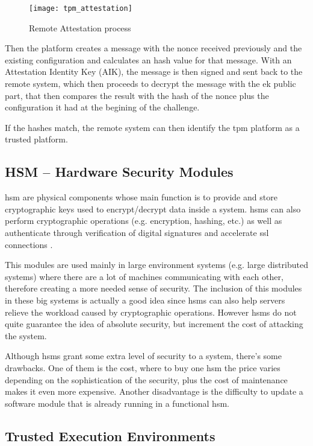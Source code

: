 \begin{figure}[htbp]
	\centering
	{\texttt{[image: tpm\_attestation]}}%
	\caption{Remote Attestation process}
	\label{fig:tpm_attestation}
\end{figure}

Then the platform creates a message with the nonce received previously and the existing configuration and calculates an hash value for that message. With an Attestation Identity Key (AIK), the message is then signed and sent back to the remote system, which then proceeds to decrypt the message with the \gls{ek} public part, that then compares the result with the hash of the nonce plus the configuration it had at the begining of the challenge. 

If the hashes match, the remote system can then identify the \gls{tpm} platform as a trusted platform.

\subsection{HSM – Hardware Security Modules}
\label{ssec:hsm}

\gls{hsm} \cite{hsmPaper} are physical components whose main function is to provide and store cryptographic keys used to encrypt/decrypt data inside a system. \gls{hsm}s can also perform cryptographic operations (e.g. encryption, hashing, etc.) as well as authenticate through verification of digital signatures and accelerate \gls{ssl} connections \cite{hsmThesis}.

This modules are used mainly in large environment systems (e.g. large distributed systems) where there are a lot of machines communicating with each other, therefore creating a more needed sense of security. The inclusion of this modules in these big systems is actually a good idea since \gls{hsm}s can also help servers relieve the workload caused by cryptographic operations. However \gls{hsm}s do not quite guarantee the idea of absolute security, but increment the cost of attacking the system.

Although \gls{hsm}s grant some extra level of security to a system, there's some drawbacks. One of them is the cost, where to buy one \gls{hsm} the price varies depending on the sophistication of the security, plus the cost of maintenance makes it even more expensive. Another disadvantage is the difficulty to update a software module that is already running in a functional \gls{hsm}.

\subsection{Trusted Execution Environments}
\label{ssec:tee}

